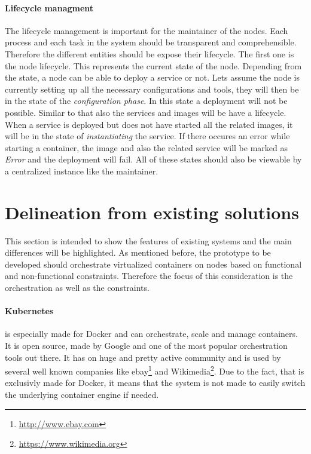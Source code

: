 \paragraph{Lifecycle managment}
The lifecycle management is important for the maintainer of the nodes.
Each process and each task in the system should be transparent and comprehensible.
Therefore the different entities should be expose their lifecycle.
The first one is the node lifecycle.
This represents the current state of the node.
Depending from the state, a node can be able to deploy a service or not.
Lets assume the node is currently setting up all the necessary configurations and tools, they will then be in the state of the \textit{configuration phase}.
In this state a deployment will not be possible.
Similar to that also the services and images will be have a lifecycle.
When a service is deployed but does not have started all the related images, it will be in the state of \textit{instantiating} the service.
If there occures an error while starting a container, the image and also the related service will be marked as \textit{Error} and the deployment will fail.
All of these states should also be viewable by a centralized instance like the maintainer.


\section{Delineation from existing solutions}
\label{section:delineation-from-existing-solutions}
This section is intended to show the features of existing systems and the main differences will be highlighted.
As mentioned before, the prototype to be developed should orchestrate virtualized containers on nodes based on functional and non-functional constraints.
Therefore the focus of this consideration is the orchestration as well as the constraints.

\paragraph{Kubernetes} is especially made for Docker and can orchestrate, scale and manage containers.
It is open source, made by Google and one of the most popular orchestration tools out there.
It has on huge and pretty active community and is used by several well known companies\autocite{Kubernetes:Case-Studies} like ebay\footnote{\url{http://www.ebay.com}} and Wikimedia\footnote{\url{https://www.wikimedia.org}}.
Due to the fact, that is exclusivly made for Docker, it means that the system is not made to easily switch the underlying container engine if needed.

